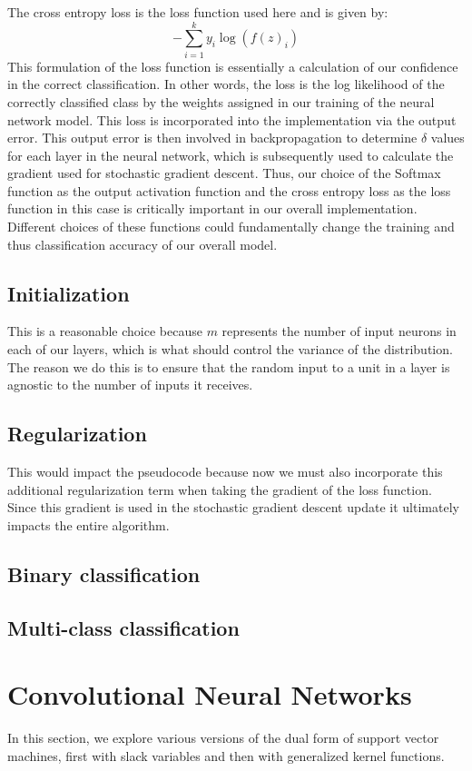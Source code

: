 \documentclass{article}
\begin{document}
The cross entropy loss is the loss function used here and is given by:
$$-\sum_{i=1}^k y_i \log(f(z)_i)$$
This formulation of the loss function is essentially a calculation of our confidence in the correct classification. In other words, the loss is the log likelihood of the correctly classified class by the weights assigned in our training of the neural network model. This loss is incorporated into the implementation via the output error. This output error is then involved in backpropagation to determine $\delta$ values for each layer in the neural network, which is subsequently used to calculate the gradient used for stochastic gradient descent. Thus, our choice of the Softmax function as the output activation function and the cross entropy loss as the loss function in this case is critically important in our overall implementation. Different choices of these functions could fundamentally change the training and thus classification accuracy of our overall model.

\subsection{Initialization}
This is a reasonable choice because $m$ represents the number of input neurons in each of our layers, which is what should control the variance of the distribution. The reason we do this is to ensure that the random input to a unit in a layer is agnostic to the number of inputs it receives.

\subsection{Regularization}
This would impact the pseudocode because now we must also incorporate this additional regularization term when taking the gradient of the loss function. Since this gradient is used in the stochastic gradient descent update it ultimately impacts the entire algorithm.

\subsection{Binary classification}


\subsection{Multi-class classification}



\section{Convolutional Neural Networks}
In this section, we explore various versions of the dual form of support vector machines, first with slack variables and then with generalized kernel functions.
\end{document}
